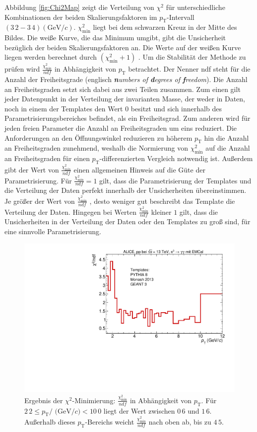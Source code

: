 \newline
Abbildung \ref{fig:Chi2Map} zeigt die Verteilung von $\chi^{2}$ für unterschiedliche Kombinationen der beiden Skalierungsfaktoren im $p_{\text{T}}$-Intervall $(3\,2 - 3\,4)(\text{GeV}/c)$.
$\chi^{2}_\text{min}$ liegt bei dem schwarzen Kreuz in der Mitte des Bildes.
Die weiße Kurve, die das Minimum umgibt, gibt die Unsicherheit bezüglich der beiden Skalierungsfaktoren an.
Die Werte auf der weißen Kurve liegen werden berechnet durch $\left(\chi^{2}_\text{min}+1\right)$ \cite{book:chi2}.
\newline
Um die Stabilität der Methode zu prüfen wird $\frac{\chi^{2}_\text{min}}{ndf}$ in Abhängigkeit von $p_{\text{T}}$ betrachtet.
Der Nenner ndf steht für die Anzahl der Freiheitsgrade (englisch \textit{\textbf{n}umbers of \textbf{d}egrees of \textbf{f}reedom}).
Die Anzahl an Freiheitsgraden setzt sich dabei aus zwei Teilen zusammen.
Zum einen gilt jeder Datenpunkt in der Verteilung der invarianten Masse, der weder in Daten, noch in einem der Templates den Wert 0 besitzt und sich innerhalb des Parametrisierungsbereiches befindet, als ein Freiheitsgrad.
Zum anderen wird für jeden freien Parameter die Anzahl an Freiheitsgraden um eins reduziert.
Die Anforderungen an den Öffnungswinkel reduzieren zu höherem $p_{\text{T}}$ hin die Anzahl an Freiheitsgraden zunehmend, weshalb die Normierung von $\chi^{2}_\text{min}$ auf die Anzahl an Freiheitsgraden für einen $p_{\text{T}}$-differenzierten Vergleich notwendig ist.
Außerdem gibt der Wert von $\frac{\chi^{2}_\text{min}}{ndf}$ einen allgemeinen Hinweis auf die Güte der Parametrisierung.
Für $\frac{\chi^{2}_\text{min}}{ndf} = 1$ gilt, dass die Parametrisierung der Templates und die Verteilung der Daten perfekt innerhalb der Unsicherheiten übereinstimmen.
Je größer der Wert von $\frac{\chi^{2}_\text{min}}{ndf}$ , desto weniger gut beschreibt das Template die Verteilung der Daten.
Hingegen bei Werten $\frac{\chi^{2}_\text{min}}{ndf}$ kleiner $1$ gilt, dass die Unsicherheiten in der Verteilung der Daten oder den Templates zu groß sind, für eine sinnvolle Parametrisierung.
\begin{figure}[t!]
\centering
\includegraphics[width=.65\linewidth]{Chi2NoComp_Data_2016.pdf}
\caption{Ergebnis der $\chi^{2}$-Minimierung: $\frac{\chi^{2}_\text{min}}{ndf}$ in Abhängigkeit von $p_{\text{T}}$.
Für $2\,2 \leq p_{\text{T}}/\text{ (GeV}/c) < 10\,0$ liegt der Wert zwischen $0\,6$ und $1\,6$.
Außerhalb dieses $p_\text{T}$-Bereichs weicht $\frac{\chi^{2}_\text{min}}{ndf}$ nach oben ab, bis zu $4\,5$.
}
\label{fig:Chi2pT}
\end{figure}
